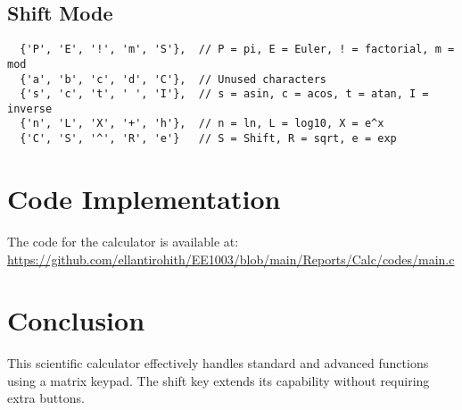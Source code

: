 \documentclass[journal,12pt,onecolumn]{IEEEtran}
\theoremstyle{remark}
\begin{document}
\subsection{Shift Mode}
\begin{verbatim}
  {'P', 'E', '!', 'm', 'S'},  // P = pi, E = Euler, ! = factorial, m = mod
  {'a', 'b', 'c', 'd', 'C'},  // Unused characters
  {'s', 'c', 't', ' ', 'I'},  // s = asin, c = acos, t = atan, I = inverse
  {'n', 'L', 'X', '+', 'h'},  // n = ln, L = log10, X = e^x
  {'C', 'S', '^', 'R', 'e'}   // S = Shift, R = sqrt, e = exp
\end{verbatim}




\section{Code Implementation}



The  code for the calculator is available at:  
\url{https://github.com/ellantirohith/EE1003/blob/main/Reports/Calc/codes/main.c}

\section{Conclusion}
This scientific calculator effectively handles standard and advanced functions using a matrix keypad. The shift key extends its capability without requiring extra buttons. 
\end{document}
